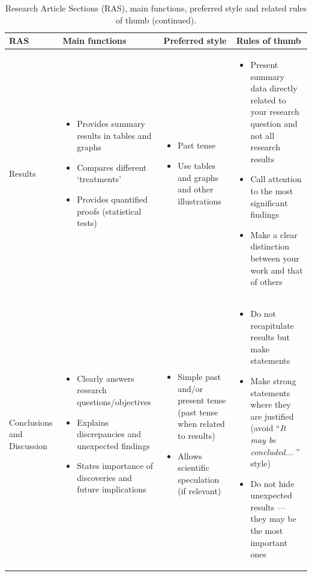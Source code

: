 \documentclass[graybox,envcountchap,sectrefs,UStrade]{svmono}
\begin{document}
{\small
\begin{table} \addtolength{\tabcolsep}{4pt}
\centering \caption{Research Article Sections (RAS), main functions, preferred style and related rules of thumb (continued).}\label{Tbl:functions2}
\begin{tabular}{m{}m{}m{}m{}}
\toprule
RAS & Main functions & Preferred style & Rules of thumb \\
\midrule
Results & \begin{itemize} \item Provides summary results in tables and graphs \item Compares different `treatments' \item Provides quantified proofs (statistical tests) \end{itemize} & \begin{itemize} \item Past tense \item Use tables and graphs and other illustrations \end{itemize} & \begin{itemize} \item Present summary data directly related to your research question and not all research results \item Call attention to the most significant findings \item Make a clear distinction between your work and that of others \end{itemize} \\
Conclusions and Discussion & \begin{itemize} \item Clearly answers research questions/objectives \item Explains discrepancies and unexpected findings \item States importance of discoveries and future implications \end{itemize} & \begin{itemize} \item Simple past and/or present tense (past tense when related to results) \item Allows scientific speculation (if relevant) \end{itemize} & \begin{itemize} \item Do not recapitulate results but make statements \item Make strong statements where they are justified (avoid ``\emph{It may be concluded... }'' style) \item Do not hide unexpected results --- they may be the most important ones \end{itemize} \\

\end{tabular}
\end{table}}
\end{document}
